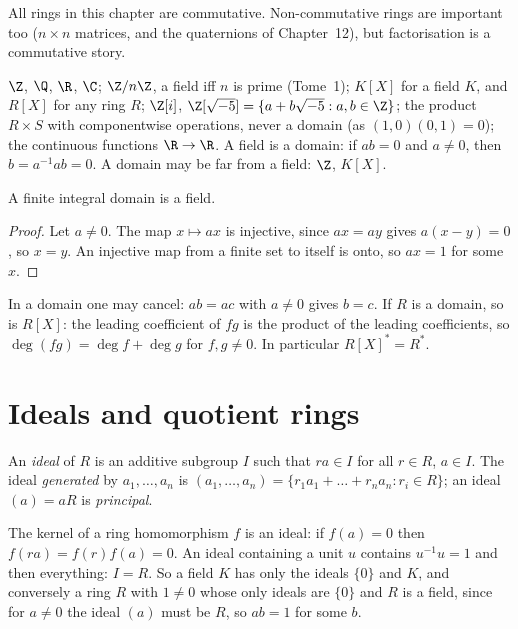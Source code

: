 All rings in this chapter are commutative. Non-commutative rings are important too ($n\times n$ matrices, and the quaternions of Chapter~12), but factorisation is a commutative story.

\begin{example}\label{ex:rings}
$\Z$, $\Q$, $\R$, $\C$; $\Z/n\Z$, a field iff $n$ is prime (Tome~1); $K[X]$ for a field $K$, and $R[X]$ for any ring $R$; $\Z[i]$, $\Z[\sqrt{-5}]=\{a+b\sqrt{-5}:a,b\in\Z\}$; the product $R\times S$ with componentwise operations, never a domain (as $(1,0)(0,1)=0$); the continuous functions $\R\to\R$. A field is a domain: if $ab=0$ and $a\ne0$, then $b=a^{-1}ab=0$. A domain may be far from a field: $\Z$, $K[X]$.
\end{example}

\begin{proposition}\label{prop:finitedomain}
A finite integral domain is a field.
\end{proposition}
\begin{proof}
Let $a\ne0$. The map $x\mapsto ax$ is injective, since $ax=ay$ gives $a(x-y)=0$, so $x=y$. An injective map from a finite set to itself is onto, so $ax=1$ for some $x$.
\end{proof}

In a domain one may cancel: $ab=ac$ with $a\ne0$ gives $b=c$. If $R$ is a domain, so is $R[X]$: the leading coefficient of $fg$ is the product of the leading coefficients, so $\deg(fg)=\deg f+\deg g$ for $f,g\ne0$. In particular $R[X]^*=R^*$.

\section{Ideals and quotient rings}

\begin{definition}
An \emph{ideal} of $R$ is an additive subgroup $I$ such that $ra\in I$ for all $r\in R$, $a\in I$. The ideal \emph{generated} by $a_1,\dots,a_n$ is $(a_1,\dots,a_n)=\{r_1a_1+\dots+r_na_n:r_i\in R\}$; an ideal $(a)=aR$ is \emph{principal}.
\end{definition}

The kernel of a ring homomorphism $f$ is an ideal: if $f(a)=0$ then $f(ra)=f(r)f(a)=0$. An ideal containing a unit $u$ contains $u^{-1}u=1$ and then everything: $I=R$. So a field $K$ has only the ideals $\{0\}$ and $K$, and conversely a ring $R$ with $1\ne0$ whose only ideals are $\{0\}$ and $R$ is a field, since for $a\ne0$ the ideal $(a)$ must be $R$, so $ab=1$ for some $b$.


